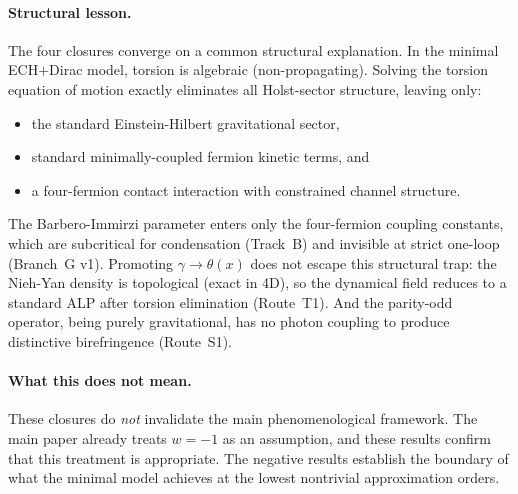 \documentclass[11pt,letterpaper]{article}
\newcommand{\BI}{\gamma}               %
\begin{document}
\paragraph{Structural lesson.}
The four closures converge on a common structural explanation. In the
minimal ECH$+$Dirac model, torsion is algebraic (non-propagating). Solving
the torsion equation of motion exactly eliminates all Holst-sector
structure, leaving only:
\begin{itemize}
  \item the standard Einstein-Hilbert gravitational sector,
  \item standard minimally-coupled fermion kinetic terms, and
  \item a four-fermion contact interaction with constrained channel
    structure.
\end{itemize}
The Barbero-Immirzi parameter enters only the four-fermion coupling
constants, which are subcritical for condensation (Track~B) and invisible
at strict one-loop (Branch~G v1). Promoting $\BI\to\theta(x)$ does not
escape this structural trap: the Nieh-Yan density is topological (exact
in 4D), so the dynamical field reduces to a standard ALP after torsion
elimination (Route~T1). And the parity-odd operator, being purely
gravitational, has no photon coupling to produce distinctive birefringence
(Route~S1).

\paragraph{What this does not mean.}
These closures do \emph{not} invalidate the main phenomenological framework.
The main paper already treats $w=-1$ as an assumption, and these results
confirm that this treatment is appropriate. The negative results establish
the boundary of what the minimal model achieves at the lowest nontrivial
approximation orders.
\end{document}
